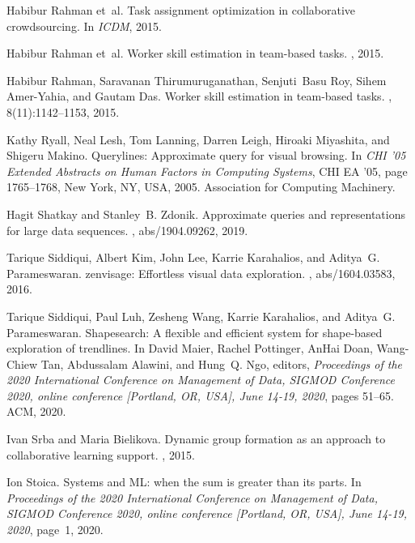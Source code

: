 \documentclass[11pt]{article}
\begin{document}
\begin{thebibliography}{10}
\begin{small}
Habibur Rahman et~al.
\newblock Task assignment optimization in collaborative crowdsourcing.
\newblock In {\em ICDM}, 2015.

Habibur Rahman et~al.
\newblock Worker skill estimation in team-based tasks.
, 2015.

Habibur Rahman, Saravanan Thirumuruganathan, Senjuti~Basu Roy, Sihem
  Amer-Yahia, and Gautam Das.
\newblock Worker skill estimation in team-based tasks.
, 8(11):1142--1153, 2015.

Kathy Ryall, Neal Lesh, Tom Lanning, Darren Leigh, Hiroaki Miyashita, and
  Shigeru Makino.
\newblock Querylines: Approximate query for visual browsing.
\newblock In {\em CHI ’05 Extended Abstracts on Human Factors in Computing
  Systems}, CHI EA ’05, page 1765–1768, New York, NY, USA, 2005.
  Association for Computing Machinery.

Hagit Shatkay and Stanley~B. Zdonik.
\newblock Approximate queries and representations for large data sequences.
, abs/1904.09262, 2019.

Tarique Siddiqui, Albert Kim, John Lee, Karrie Karahalios, and Aditya~G.
  Parameswaran.
\newblock zenvisage: Effortless visual data exploration.
, abs/1604.03583, 2016.

Tarique Siddiqui, Paul Luh, Zesheng Wang, Karrie Karahalios, and Aditya~G.
  Parameswaran.
\newblock Shapesearch: {A} flexible and efficient system for shape-based
  exploration of trendlines.
\newblock In David Maier, Rachel Pottinger, AnHai Doan, Wang{-}Chiew Tan,
  Abdussalam Alawini, and Hung~Q. Ngo, editors, {\em Proceedings of the 2020
  International Conference on Management of Data, {SIGMOD} Conference 2020,
  online conference [Portland, OR, USA], June 14-19, 2020}, pages 51--65.
  {ACM}, 2020.

Ivan Srba and Maria Bielikova.
\newblock Dynamic group formation as an approach to collaborative learning
  support.
, 2015.

Ion Stoica.
\newblock Systems and {ML:} when the sum is greater than its parts.
\newblock In {\em Proceedings of the 2020 International Conference on
  Management of Data, {SIGMOD} Conference 2020, online conference [Portland,
  OR, USA], June 14-19, 2020}, page~1, 2020.


\end{small}
\end{thebibliography}
\end{document}
